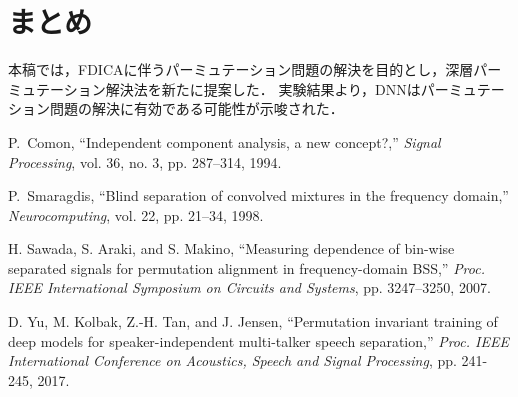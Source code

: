 \documentclass[a4j]{jsarticle}
\begin{document}
\section{まとめ}
本稿では，FDICAに伴うパーミュテーション問題の解決を目的とし，深層パーミュテーション解決法を新たに提案した．
実験結果より，DNNはパーミュテーション問題の解決に有効である可能性が示唆された．

\begin{thebibliography}{9}%
\footnotesize{
P.~Comon, ``Independent component analysis, a new concept?,'' \textit{Signal Processing}, vol. 36, no. 3, pp. 287--314, 1994.

P.~Smaragdis, ``Blind separation of convolved mixtures in the frequency domain,'' \textit{Neurocomputing}, vol. 22, pp. 21--34, 1998.

H. Sawada, S. Araki, and S. Makino, ``Measuring dependence of bin-wise separated signals for permutation alignment in frequency-domain BSS,'' \textit{Proc. IEEE International Symposium on Circuits and Systems}, pp. 3247--3250, 2007.

D. Yu, M. Kolbak, Z.-H. Tan, and J. Jensen, ``Permutation invariant training of deep models for speaker-independent multi-talker speech separation,'' \textit{Proc. IEEE International Conference on Acoustics, Speech and Signal Processing}, pp. 241-245, 2017. 
}
\end{thebibliography}
\end{document}
